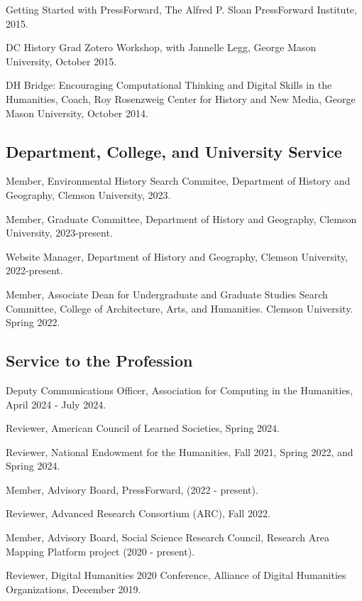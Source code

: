 \documentclass[11pt]{article}
\begin{document}
Getting Started with PressForward, The Alfred P. Sloan PressForward Institute, 2015.

DC History Grad Zotero Workshop, with Jannelle Legg, George Mason University, October 2015.

DH Bridge: Encouraging Computational Thinking and Digital Skills in the Humanities, Coach, Roy Rosenzweig Center for History and New Media, George Mason University, October 2014.

\subsection{Department, College, and University Service}\label{Department, College, and University Service}
Member, Environmental History Search Commitee, Department of History and Geography, Clemson University, 2023.

Member, Graduate Committee, Department of History and Geography, Clemson University, 2023-present.

Website Manager, Department of History and Geography, Clemson University, 2022-present.

Member, Associate Dean for Undergraduate and Graduate Studies Search Committee, College of Architecture, Arts, and Humanities. Clemson University. Spring 2022.

\subsection{Service to the Profession}\label{Other Professional and Community Service}


Deputy Communications Officer, Association for Computing in the Humanities, April 2024 - July 2024.

Reviewer, American Council of Learned Societies, Spring 2024.

Reviewer, National Endowment for the Humanities, Fall 2021, Spring 2022, and Spring 2024.

Member, Advisory Board, PressForward, (2022 - present).

Reviewer, Advanced Research Consortium (ARC), Fall 2022. 

Member, Advisory Board, Social Science Research Council, Research Area Mapping Platform project (2020 - present).

Reviewer, Digital Humanities 2020 Conference, Alliance of Digital Humanities Organizations, December 2019.
\end{document}
